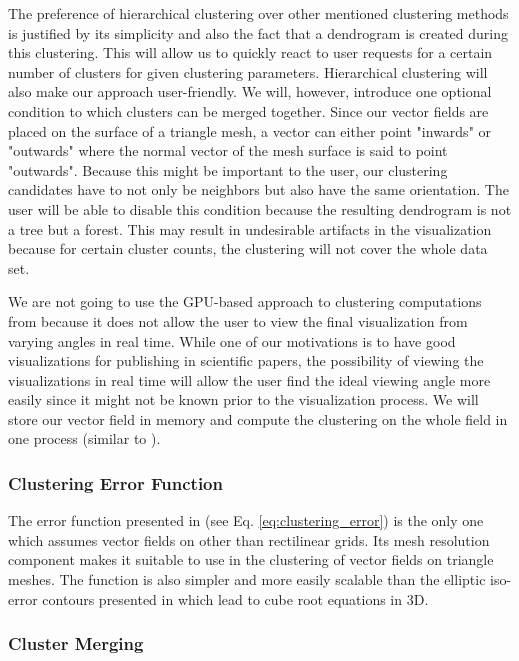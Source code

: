The preference of hierarchical clustering over other mentioned clustering methods is justified by its simplicity and also the fact that a dendrogram is created during this clustering. This will allow us to quickly react to user requests for a certain number of clusters for given clustering parameters. Hierarchical clustering will also make our approach user-friendly. We will, however, introduce one optional condition to which clusters can be merged together. Since our vector fields are placed on the surface of a triangle mesh, a vector can either point "inwards" or "outwards" where the normal vector of the mesh surface is said to point "outwards". Because this might be important to the user, our clustering candidates have to not only be neighbors but also have the same orientation. The user will be able to disable this condition because the resulting dendrogram is not a tree but a forest. This may result in undesirable artifacts in the visualization because for certain cluster counts, the clustering will not cover the whole data set.

We are not going to use the GPU-based approach to clustering computations from \citet{Peng12} because it does not allow the user to view the final visualization from varying angles in real time. While one of our motivations is to have good visualizations for publishing in scientific papers, the possibility of viewing the visualizations in real time will allow the user find the ideal viewing angle more easily since it might not be known prior to the visualization process. We will store our vector field in memory and compute the clustering on the whole field in one process (similar to \citet{Telea99}).

\subsubsection{Clustering Error Function}

The error function presented in \citet{Peng12} (see Eq. \ref{eq:clustering_error}) is the only one which assumes vector fields on other than rectilinear grids. Its mesh resolution component makes it suitable to use in the clustering of vector fields on triangle meshes. The function is also simpler and more easily scalable than the elliptic iso-error contours presented in \citet{Telea99} which lead to cube root equations in 3D.

\subsubsection{Cluster Merging}

